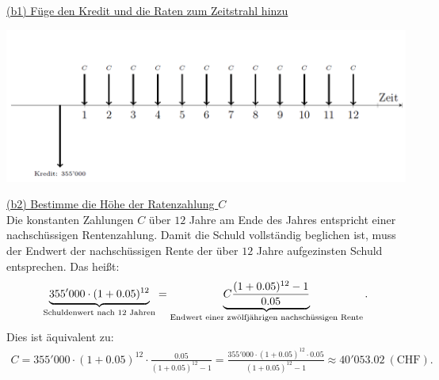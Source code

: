 \newpage
\underline{(b1) Füge den Kredit und die Raten zum Zeitstrahl hinzu}\\
\begin{center}
	\includegraphics[scale=0.55]{pictures/zeitstrahl_1_b_filled_1}
\end{center}

\underline{(b2) Bestimme die Höhe der Ratenzahlung $ C $}\\
Die konstanten Zahlungen $ C $ über $ 12 $ Jahre am Ende des Jahres entspricht einer nachschüssigen Rentenzahlung.
Damit die Schuld vollständig beglichen ist, muss der Endwert der nachschüssigen Rente der über $ 12 $ Jahre aufgezinsten Schuld entsprechen.
Das heißt:
\begin{align*}
	\underbrace{355'000 \cdot (1+ 0.05)^{12}}_{\textrm{Schuldenwert nach $ 12 $ Jahren}}
	=
	\underbrace{C \frac{(1+0.05)^{12} -1}{0.05}}_{\textrm{Endwert einer zwölfjährigen nachschüssigen Rente}}.
\end{align*}
Dies ist äquivalent zu:
\begin{align*}
	C = 355'000 \cdot (1+ 0.05)^{12} \cdot \frac{0.05}{(1+0.05)^{12} -1}
	=
	\frac{355'000\cdot (1+ 0.05)^{12} \cdot 0.05 }{(1+0.05)^{12} -1}
	\approx
	40'053.02 \ \mathrm{(CHF)}.
\end{align*}

